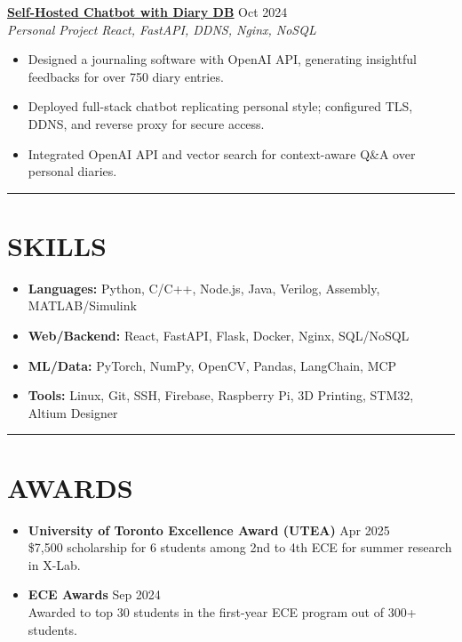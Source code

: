 \documentclass[letterpaper,10pt]{article}
\begin{document}
\vspace{0.2em}
\noindent\href{https://chengyongkang.me/chat}{\uline{\textbf{Self-Hosted Chatbot with Diary DB}}} \hfill Oct 2024\\
\textit{Personal Project \textbar{} React, FastAPI, DDNS, Nginx, NoSQL}
\begin{itemize}
	\item Designed a journaling software with OpenAI API, generating insightful feedbacks for over 750 diary entries.
    \item Deployed full-stack chatbot replicating personal style; configured TLS, DDNS, and reverse proxy for secure access.
    \item Integrated OpenAI API and vector search for context-aware Q\&A over personal diaries.
\end{itemize}

\noindent\rule{\linewidth}{1pt}

\section*{\textbf{SKILLS}}
\begin{itemize}
    \item \textbf{Languages:} Python, C/C++, Node.js, Java, Verilog, Assembly, MATLAB/Simulink
    \item \textbf{Web/Backend:} React, FastAPI, Flask, Docker, Nginx, SQL/NoSQL
    \item \textbf{ML/Data:} PyTorch, NumPy, OpenCV, Pandas, LangChain, MCP
    \item \textbf{Tools:} Linux, Git, SSH, Firebase, Raspberry Pi, 3D Printing, STM32, Altium Designer
\end{itemize}

\noindent\rule{\linewidth}{1pt}

\section*{\textbf{AWARDS}}

\begin{itemize}[leftmargin=0.2in]
	\item \textbf{University of Toronto Excellence Award (UTEA)} \hfill Apr 2025\\
    \$7,500 scholarship for 6 students among 2nd to 4th ECE for summer research in X-Lab.
	\item \textbf{ECE Awards} \hfill Sep 2024\\
	Awarded to top 30 students in the first-year ECE program out of 300+ students.
\end{itemize}
\end{document}
